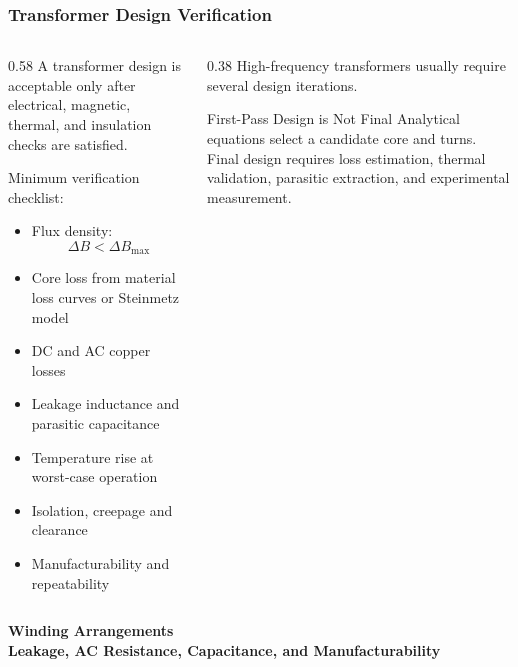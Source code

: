 \begin{frame}
    \frametitle{Transformer Design Verification}

    \begin{columns}
        \begin{column}{0.58\textwidth}
            A transformer design is acceptable only after electrical, magnetic, thermal, and insulation checks are satisfied.

            \vspace{0.15cm}

            Minimum verification checklist:
            \begin{itemize}
                \item Flux density:
                \[
                    \Delta B < \Delta B_{\max}
                \]
                \item Core loss from material loss curves or Steinmetz model
                \item DC and AC copper losses
                \item Leakage inductance and parasitic capacitance
                \item Temperature rise at worst-case operation
                \item Isolation, creepage and clearance
                \item Manufacturability and repeatability
            \end{itemize}

        \end{column}

        \begin{column}{0.38\textwidth}
        High-frequency transformers usually require several design iterations.
            \begin{block}{First-Pass Design is Not Final}
                \small
                Analytical equations select a candidate core and turns. Final design requires loss estimation, thermal validation, parasitic extraction, and experimental measurement.
            \end{block}
        \end{column}
    \end{columns}
\end{frame}

\begin{frame}
\begin{center}
  \textbf{\Huge{Winding Arrangements}}\\[0.4cm]
  \textbf{\Large{Leakage, AC Resistance, Capacitance, and Manufacturability}}
\end{center}
\end{frame}


